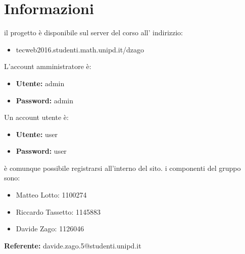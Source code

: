 \section{Informazioni}
il progetto è disponibile sul server del corso all' indirizzio: 
\begin{itemize}
	\item tecweb2016.studenti.math.unipd.it/dzago
\end{itemize}
L'account amministratore è:
\begin{itemize}
    \item \textbf{Utente:} admin
    \item \textbf{Password:} admin	
\end{itemize}
Un account utente è:
\begin{itemize}
	\item \textbf{Utente:} user
	\item \textbf{Password:} user
\end{itemize}
è comunque possibile registrarsi all'interno del sito.\newline
i componenti del gruppo sono:
\begin{itemize}
	\item Matteo Lotto:  1100274
	\item Riccardo Tassetto: 1145883
	\item Davide Zago: 1126046
\end{itemize}
\textbf{Referente:} davide.zago.5@studenti.unipd.it
